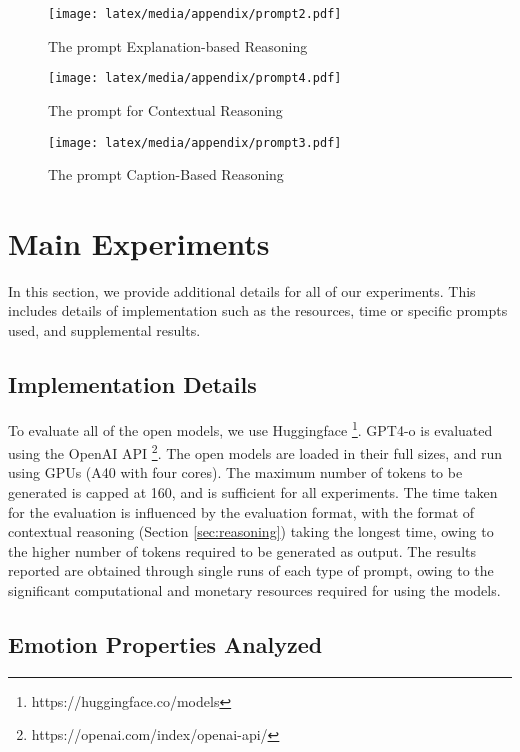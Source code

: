 \begin{figure*}
    \centering
    \texttt{[image: latex/media/appendix/prompt2.pdf]}
    \caption{The prompt Explanation-based Reasoning}
    \label{fig:exp2_prompt}
\end{figure*}

\begin{figure*}
    \centering
    \texttt{[image: latex/media/appendix/prompt4.pdf]}
    \caption{The prompt for Contextual Reasoning}
    \label{fig:exp3_prompt}
\end{figure*}

\begin{figure*}
    \centering
    \texttt{[image: latex/media/appendix/prompt3.pdf]}
    \caption{The prompt Caption-Based Reasoning}
    \label{fig:exp4_prompt}
\end{figure*}

\section{Main Experiments}

In this section, we provide additional details for all of our experiments. This includes details of implementation such as the resources, time or specific prompts used, and supplemental results.  

\subsection{Implementation Details}
\label{app:exp_impl}

To evaluate all of the open models, we use Huggingface \footnote{https://huggingface.co/models}. GPT4-o is evaluated using the OpenAI API \footnote{https://openai.com/index/openai-api/}. The open models are loaded in their full sizes, and run using GPUs (A40 with four cores). The maximum number of tokens to be generated is capped at 160, and is sufficient for all experiments. The time taken for the evaluation is influenced by the evaluation format, with the format of contextual reasoning (Section \ref{sec:reasoning}) taking the longest time, owing to the higher number of tokens required to be generated as output. The results reported are obtained through single runs of each type of prompt, owing to the significant computational and monetary resources required for using the models. 

\subsection{Emotion Properties Analyzed}
\label{app:emotion_properties}

